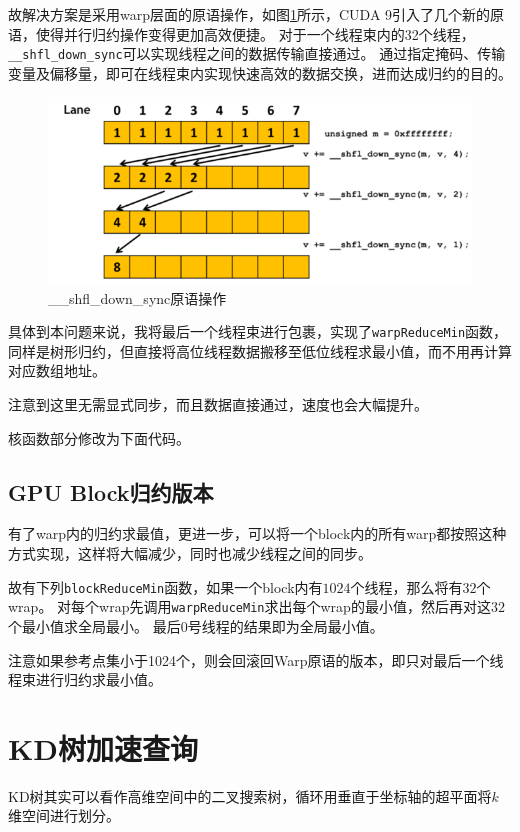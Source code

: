\documentclass[logo,reportComp]{thesis}
\def\sharedmem{\textcolor{red}{\kaiti 共享内存}}
\def\register{\textcolor{orange}{\kaiti 寄存器}}
\begin{document}
故解决方案是采用warp层面的原语操作，如图\ref{fig:shfl_down}所示，CUDA 9引入了几个新的原语，使得并行归约操作变得更加高效便捷。
对于一个线程束内的32个线程，\verb'__shfl_down_sync'可以实现线程之间的数据传输直接通过。
通过指定掩码、传输变量及偏移量，即可在线程束内实现快速高效的数据交换，进而达成归约的目的。
\begin{figure}[H]
\centering
\includegraphics[width=0.8\linewidth]{fig/reduce_shfl_down.png}
\caption{\_\_shfl\_down\_sync原语操作}
\label{fig:shfl_down}
\end{figure}

具体到本问题来说，我将最后一个线程束进行包裹，实现了\verb'warpReduceMin'函数，同样是树形归约，但直接将高位线程数据搬移至低位线程求最小值，而不用再计算对应数组地址。


注意到这里无需显式同步，而且数据直接通过，速度也会大幅提升。

核函数部分修改为下面代码。


\subsection{GPU Block归约版本}
有了warp内的归约求最值，更进一步，可以将一个block内的所有warp都按照这种方式实现，这样将大幅减少，同时也减少线程之间的同步。

故有下列\verb'blockReduceMin'函数，如果一个block内有$1024$个线程，那么将有$32$个wrap。
对每个wrap先调用\verb'warpReduceMin'求出每个wrap的最小值，然后再对这$32$个最小值求全局最小。
最后0号线程的结果即为全局最小值。


注意如果参考点集小于1024个，则会回滚回Warp原语的版本，即只对最后一个线程束进行归约求最小值。

\section{KD树加速查询}
\label{sec:kdtree}
KD树其实可以看作高维空间中的二叉搜索树，循环用垂直于坐标轴的超平面将$k$维空间进行划分。
\end{document}
